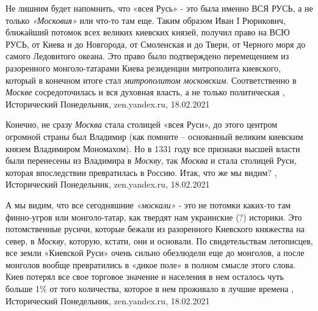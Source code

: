 Не лишним будет напомнить, что «всея Русь» - это была именно ВСЯ РУСЬ, а не
только \emph{«Московия»} или что-то там еще. Таким образом Иван I Рюрикович, ближайший
потомок всех великих киевских князей, получил право на ВСЮ РУСЬ, от Киева и до
Новгорода, от Смоленская и до Твери, от Черного моря до самого Ледовитого
океана. Это право было подтверждено перемещением из разоренного
монголо-татарами Киева резиденции митрополита киевского, который в конечном
итоге стал \emph{митрополитом московским}. Соответственно в \emph{Москве} сосредоточилась и
вся духовная власть, а не только политическая
, 
Исторический Понедельник, zen.yandex.ru, 18.02.2021

Конечно, не сразу \emph{Москва} стала столицей «всея Руси», до этого центром огромной
страны был Владимир (как помните – основанный великим киевским князем
Владимиром Мономахом). Но в 1331 году все признаки высшей власти были
перенесены из Владимира в \emph{Москву}, так \emph{Москва} и стала столицей Руси, которая
впоследствии превратилась в Россию.  Итак, что же мы видим?
, 
Исторический Понедельник, zen.yandex.ru, 18.02.2021

А мы видим, что все сегодняшние \emph{«москали»} - это не потомки каких-то там
финно-угров или монголо-татар, как твердят нам украинские (?) историки. Это
потомственные русичи, которые бежали из разоренного Киевского княжества на
север, в \emph{Москву}, которую, кстати, они и основали. По свидетельствам летописцев,
все земли «Киевской Руси» очень сильно обезлюдели еще до монголов, а после
монголов вообще превратились в «дикое поле» в полном смысле этого слова. Киев
потерял все свое торговое значение и населения в нем осталось чуть больше 1\% от
того количества, которое в нем проживало в лучшие времена
, 
Исторический Понедельник, zen.yandex.ru, 18.02.2021

